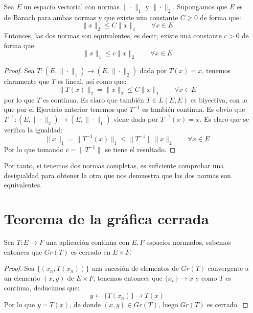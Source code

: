\begin{coro}\label{coro:equivalencia_normas}
    Sea $E$ un espacio vectorial con normas $\|\cdot \|_1$ y $\|\cdot \|_2$. Supongamos que $E$ es de Banach para ambas normas y que existe una constante $C\geq 0$ de forma que:
    \begin{equation*}
        \|x\|_2 \leq C\|x\|_1 \qquad \forall x\in E
    \end{equation*}
    Entonces, las dos normas son equivalentes, es decir, existe una constante $c>0$ de forma que:
    \begin{equation*}
        \|x\|_1 \leq c\|x\|_2 \qquad \forall x\in E
    \end{equation*}
    \begin{proof}
        Sea $T:(E,\|\cdot \|_1)\to (E,\|\cdot \|_2)$ dada por $T(x) = x$, tenemos claramente que $T$ es lineal, así como que:
        \begin{equation*}
            \|T(x)\|_2 = \|x\|_2 \leq C\|x\|_1 \qquad \forall x\in E
        \end{equation*}
        por lo que $T$ es continua. Es claro que también $T\in L(E,E)$ es biyectiva, con lo que por el Ejercicio anterior tenemos que $T^{-1}$ es también continua. Es obvio que $T^{-1}:(E,\|\cdot \|_2)\to (E,\|\cdot \|_1)$ viene dada por $T^{-1}(x) = x$. Es claro que se verifica la igualdad:
        \begin{equation*}
            \|x\|_1 = \|T^{-1}(x)\|_1 \leq \|T^{-1}\|\|x\|_2 \qquad \forall x\in E
        \end{equation*}
        Por lo que tomando $c = \|T^{-1}\|$ se tiene el resultado.
    \end{proof}
\end{coro}

\noindent
Por tanto, si tenemos dos normas completas, es suficiente comprobar una desigualdad para obtener la otra que nos demuestra que las dos normas son equivalentes. 

\section{Teorema de la gráfica cerrada}
\noindent
Sea $T:E\to F$ una aplicación continua con $E,F$ espacios normados, sabemos entonces que $Gr(T)$ es cerrado en $E\times F$.
\begin{proof}
    Sea $\{(x_n,T(x_n))\}$ una sucesión de elementos de $Gr(T)$ convergente a un elemento $(x,y)$ de $E\times F$, tenemos entonces que $\{x_n\}\to x$ y como $T$ es continua, deducimos que:
    \begin{equation*}
        y\leftarrow \{T(x_n)\} \to T(x)
    \end{equation*}
    Por lo que $y = T(x)$, de donde $(x,y)\in Gr(T)$, luego $Gr(T)$ es cerrado.
\end{proof}

